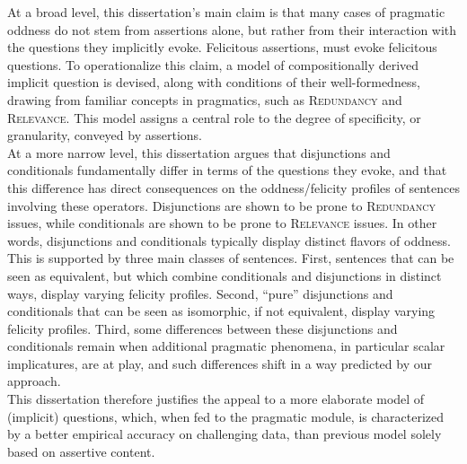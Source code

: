 %
%

At a broad level, this dissertation's main claim is that many cases of pragmatic oddness do not stem from assertions alone, but rather from their interaction with the questions they implicitly  evoke. Felicitous assertions, must evoke felicitous questions. To operationalize this claim, a model of compositionally derived implicit question is devised, along with conditions of their well-formedness, drawing from familiar concepts in pragmatics, such as \textsc{Redundancy} and \textsc{Relevance}. This model assigns a central role to the degree of specificity, or granularity, conveyed by assertions.\\

At a more narrow level, this dissertation argues that disjunctions and conditionals fundamentally differ in terms of the questions they evoke, and that this difference has direct consequences on the oddness/felicity profiles of sentences involving these operators. Disjunctions are shown to be prone to \textsc{Redundancy} issues, while conditionals are shown to be prone to \textsc{Relevance} issues. In other words, disjunctions and conditionals typically display distinct flavors of oddness. This is supported by three main classes of sentences. First, sentences that can be seen as equivalent, but which combine conditionals and disjunctions in distinct ways, display varying felicity profiles. Second, ``pure'' disjunctions and conditionals that can be seen as isomorphic, if not equivalent, display varying felicity profiles. Third, some differences between these disjunctions and conditionals remain when additional pragmatic phenomena, in particular scalar implicatures, are at play, and such differences shift in a way predicted by our approach.\\

This dissertation therefore justifies the appeal to a more elaborate model of (implicit) questions, which, when fed to the pragmatic module, is characterized by a better empirical accuracy on challenging data, than previous model solely based on assertive content.
